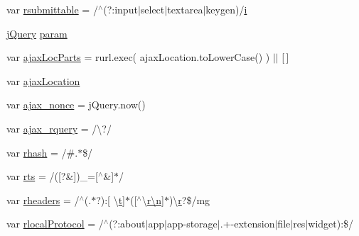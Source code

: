 \begin{DoxyCompactItemize}
\item 
var \hyperlink{obj_2_release_2_package_2_package_tmp_2_scripts_2jquery-1_810_82_8js_a12d248d7e6c5985c5ea21f56fbef9e90}{rsubmittable} = /$^\wedge$(?\+:input$\vert$select$\vert$textarea$\vert$keygen)/\hyperlink{_scripts_2respond_8min_8js_a5e25b1d1bed9ab5f3174b76d6a722180}{i}
\item 
\hyperlink{_scripts_2jquery-1_810_82_8js_a41c2e1bff4a6b292938143764e31d789}{j\+Query} \hyperlink{obj_2_release_2_package_2_package_tmp_2_scripts_2jquery-1_810_82_8js_a24ced9cd3c9e1970a8cbe8d7adedc765}{param}
\item 
var \hyperlink{obj_2_release_2_package_2_package_tmp_2_scripts_2jquery-1_810_82_8js_a4c35110da3c335cfca38505ee65a5e79}{ajax\+Loc\+Parts} = rurl.\+exec( ajax\+Location.\+to\+Lower\+Case() ) $\vert$$\vert$ \mbox{[}$\,$\mbox{]}
\item 
var \hyperlink{obj_2_release_2_package_2_package_tmp_2_scripts_2jquery-1_810_82_8js_a1661d4e1676e7c6ffde5a3cb8d8ae246}{ajax\+Location}
\item 
var \hyperlink{obj_2_release_2_package_2_package_tmp_2_scripts_2jquery-1_810_82_8js_aaa43e6d4c76ee8be878dd7e93fb755a4}{ajax\+\_\+nonce} = j\+Query.\+now()
\item 
var \hyperlink{obj_2_release_2_package_2_package_tmp_2_scripts_2jquery-1_810_82_8js_a4da85c0011217bf1643139dc23999c5c}{ajax\+\_\+rquery} = /\textbackslash{}?/
\item 
var \hyperlink{obj_2_release_2_package_2_package_tmp_2_scripts_2jquery-1_810_82_8js_a6990b6955b6bec9dd39f3814cfb56d6d}{rhash} = /\#.$\ast$\$/
\item 
var \hyperlink{obj_2_release_2_package_2_package_tmp_2_scripts_2jquery-1_810_82_8js_a38ff30904f54277281a13514d7aea00d}{rts} = /(\mbox{[}?\&\mbox{]})\+\_\+=\mbox{[}$^\wedge$\&\mbox{]}$\ast$/
\item 
var \hyperlink{obj_2_release_2_package_2_package_tmp_2_scripts_2jquery-1_810_82_8js_af506d11612139f03091db71089d92e8b}{rheaders} = /$^\wedge$(.$\ast$?)\+:\mbox{[} \textbackslash{}\hyperlink{_scripts_2jquery_8validate_8min_8js_a23c5666e83bbbceee94adcd0851f50c4}{t}\mbox{]}$\ast$(\mbox{[}$^\wedge$\textbackslash{}\hyperlink{_scripts_2ai_80_822_89-build00167_8min_8js_afc984c4f6c68ce30a0af99006f5f8d27}{r\textbackslash{}n}\mbox{]}$\ast$)\textbackslash{}\hyperlink{_scripts_2ai_80_822_89-build00167_8min_8js_a07c0e0a63b5b484807c0331c78558c9e}{r}?\$/mg
\item 
var \hyperlink{obj_2_release_2_package_2_package_tmp_2_scripts_2jquery-1_810_82_8js_af4dd13c90298bbf53ce08ec707dc9e2a}{rlocal\+Protocol} = /$^\wedge$(?\+:about$\vert$app$\vert$app-\/storage$\vert$.+-\/extension$\vert$file$\vert$res$\vert$widget)\+:\$/
$$
\end{DoxyCompactItemize}

